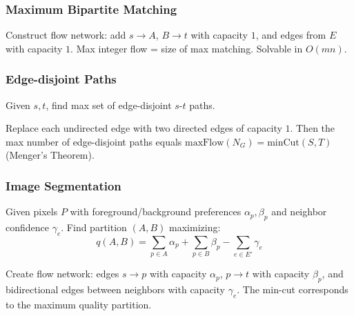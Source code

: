 \subsubsection{Maximum Bipartite Matching}
\begin{remark}
	Construct flow network: add $s \to A$, $B \to t$ with capacity $1$, and edges from $E$ with capacity $1$. Max integer flow = size of max matching. Solvable in $O(mn)$.
\end{remark}

\subsubsection{Edge-disjoint Paths}
\begin{definition}
	Given $s, t$, find max set of edge-disjoint $s$-$t$ paths.
\end{definition}

\begin{theorem}
	Replace each undirected edge with two directed edges of capacity $1$. Then the max number of edge-disjoint paths equals $\text{maxFlow}(N_G) = \text{minCut}(S,T)$ (Menger's Theorem).
\end{theorem}

\subsubsection{Image Segmentation}
\begin{definition}
	Given pixels $P$ with foreground/background preferences $\alpha_p, \beta_p$ and neighbor confidence $\gamma_e$. Find partition $(A,B)$ maximizing:
	$$q(A,B) = \sum_{p \in A} \alpha_p + \sum_{p \in B} \beta_p - \sum_{e \in E'} \gamma_e$$
\end{definition}

\begin{theorem}
	Create flow network: edges $s \to p$ with capacity $\alpha_p$, $p \to t$ with capacity $\beta_p$, and bidirectional edges between neighbors with capacity $\gamma_e$. The min-cut corresponds to the maximum quality partition.
\end{theorem}
